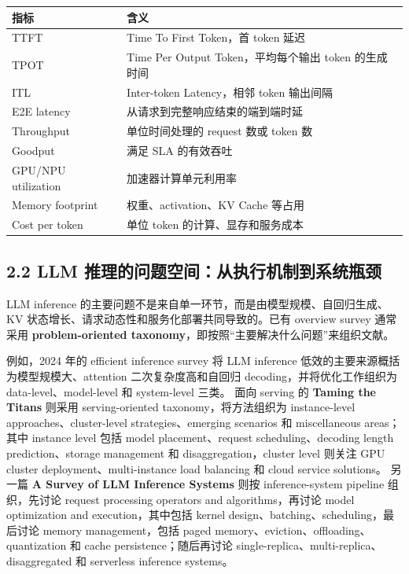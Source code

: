 \documentclass[a4paper,10pt]{ctexart}
\begin{document}
\begin{table}[H]
\centering
\scriptsize
\setlength{\tabcolsep}{3pt}
\renewcommand{\arraystretch}{1.15}
\begin{tabularx}{\textwidth}{|X|X|}
\hline
\textbf{\textbf{指标}} & \textbf{\textbf{含义}} \\ \hline
TTFT & Time To First Token，首 token 延迟 \\ \hline
TPOT & Time Per Output Token，平均每个输出 token 的生成时间 \\ \hline
ITL & Inter-token Latency，相邻 token 输出间隔 \\ \hline
E2E latency & 从请求到完整响应结束的端到端时延 \\ \hline
Throughput & 单位时间处理的 request 数或 token 数 \\ \hline
Goodput & 满足 SLA 的有效吞吐 \\ \hline
GPU/NPU utilization & 加速器计算单元利用率 \\ \hline
Memory footprint & 权重、activation、KV Cache 等占用 \\ \hline
Cost per token & 单位 token 的计算、显存和服务成本 \\ \hline
\end{tabularx}
\end{table}




\subsection*{2.2 LLM 推理的问题空间：从执行机制到系统瓶颈}

LLM inference 的主要问题不是来自单一环节，而是由模型规模、自回归生成、KV 状态增长、请求动态性和服务化部署共同导致的。已有 overview survey 通常采用 \textbf{problem-oriented taxonomy}，即按照“主要解决什么问题”来组织文献。


例如，2024 年的 efficient inference survey 将 LLM inference 低效的主要来源概括为模型规模大、attention 二次复杂度高和自回归 decoding，并将优化工作组织为 data-level、model-level 和 system-level 三类。  面向 serving 的 \textbf{Taming the Titans} 则采用 serving-oriented taxonomy，将方法组织为 instance-level approaches、cluster-level strategies、emerging scenarios 和 miscellaneous areas；其中 instance level 包括 model placement、request scheduling、decoding length prediction、storage management 和 disaggregation，cluster level 则关注 GPU cluster deployment、multi-instance load balancing 和 cloud service solutions。  另一篇 \textbf{A Survey of LLM Inference Systems} 则按 inference-system pipeline 组织，先讨论 request processing operators and algorithms，再讨论 model optimization and execution，其中包括 kernel design、batching、scheduling，最后讨论 memory management，包括 paged memory、eviction、offloading、quantization 和 cache persistence；随后再讨论 single-replica、multi-replica、disaggregated 和 serverless inference systems。 
\end{document}

